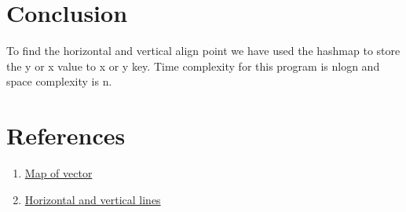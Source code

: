 \documentclass[conference]{IEEEtran}
\begin{document}
\section{\textbf {Conclusion}} 
\noindent To find the horizontal and vertical align point we have used the hashmap to store the y or x value to x or y key. Time complexity for this program is nlogn and space complexity is n.\\

\section{\textbf {References}} 

\begin{enumerate}

\item \href{https://www.geeksforgeeks.org/map-of-vectors-in-c-stl-with-examples/}{Map of vector}\\

    
\item  \href{https://www.varsitytutors.com/hotmath/hotmath_help/topics/horizontal-vertical-lines}{Horizontal and vertical lines} \\

\end{enumerate}
\end{document}
